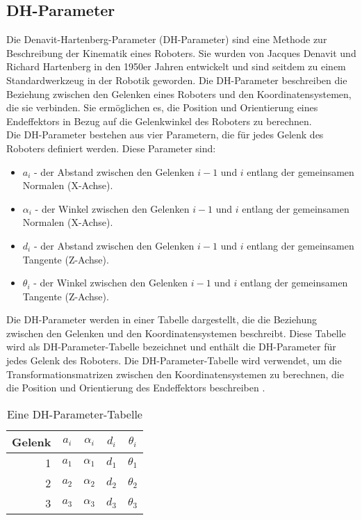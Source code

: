 \subsection{DH-Parameter}\label{subsec:DHParameter}
Die Denavit-Hartenberg-Parameter (DH-Parameter) sind eine Methode zur Beschreibung der Kinematik eines Roboters. Sie wurden von Jacques Denavit und Richard Hartenberg in den 1950er Jahren entwickelt und sind seitdem zu einem Standardwerkzeug in der Robotik geworden. Die DH-Parameter beschreiben die Beziehung zwischen den Gelenken eines Roboters und den Koordinatensystemen, die sie verbinden. Sie ermöglichen es, die Position und Orientierung eines Endeffektors in Bezug auf die Gelenkwinkel des Roboters zu berechnen.\\
Die DH-Parameter bestehen aus vier Parametern, die für jedes Gelenk des Roboters definiert werden. Diese Parameter sind:
\begin{itemize}
    \item $a_i$ - der Abstand zwischen den Gelenken $i-1$ und $i$ entlang der gemeinsamen Normalen (X-Achse).
    \item $\alpha_i$ - der Winkel zwischen den Gelenken $i-1$ und $i$ entlang der gemeinsamen Normalen (X-Achse).
    \item $d_i$ - der Abstand zwischen den Gelenken $i-1$ und $i$ entlang der gemeinsamen Tangente (Z-Achse).
    \item $\theta_i$ - der Winkel zwischen den Gelenken $i-1$ und $i$ entlang der gemeinsamen Tangente (Z-Achse).
\end{itemize}
Die DH-Parameter werden in einer Tabelle dargestellt, die die Beziehung zwischen den Gelenken und den Koordinatensystemen beschreibt. Diese Tabelle wird als DH-Parameter-Tabelle bezeichnet und enthält die DH-Parameter für jedes Gelenk des Roboters. Die DH-Parameter-Tabelle wird verwendet, um die Transformationsmatrizen zwischen den Koordinatensystemen zu berechnen, die die Position und Orientierung des Endeffektors beschreiben \cite{msi_robo_vorlesung}.\\
\begin{table}
    \centering
    \begin{tabular}[H]{r|c|c|c|c}
        \textbf{Gelenk} & \textbf{$a_i$} & \textbf{$\alpha_i$} & \textbf{$d_i$} & \textbf{$\theta_i$} \\
        \hline
        1 & $a_1$ & $\alpha_1$ & $d_1$ & $\theta_1$ \\
        2 & $a_2$ & $\alpha_2$ & $d_2$ & $\theta_2$ \\
        3 & $a_3$ & $\alpha_3$ & $d_3$ & $\theta_3$ \\
    \end{tabular}
    \label{tab:DH-Parameter}
    \caption{Eine DH-Parameter-Tabelle}
\end{table}

